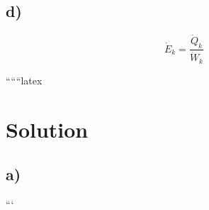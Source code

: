 \subsection*{d)}

\begin{equation}
\dot{E}_{k} = \frac{\dot{Q}_{k}}{\dot{W}_{k}}
\end{equation}

``````latex


\section*{Solution}

\subsection*{a)}

```